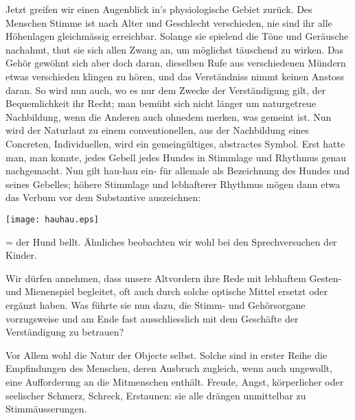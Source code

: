 Jetzt greifen wir einen Augenblick in’s physiologische Gebiet zurück. Des Menschen Stimme ist nach Alter und Geschlecht verschieden, nie sind ihr alle Höhenlagen gleichmässig erreichbar. Solange sie spielend \label{fp.302} die Töne und Geräusche nachahmt, thut sie sich allen Zwang an, um möglichst täuschend zu wirken. Das Gehör gewöhnt sich aber doch daran, dieselben Rufe aus verschiedenen Mündern etwas verschieden klingen zu hören, und das Verständniss nimmt keinen Anstoss daran. So wird nun auch, wo es nur dem Zwecke der Verständigung gilt, der Bequemlichkeit ihr Recht; man bemüht sich nicht länger um naturgetreue Nachbildung, wenn die Anderen  auch ohnedem merken, was gemeint ist. Nun wird der Naturlaut zu einem conventionellen, aus der Nachbildung eines Concreten, Individuellen, wird ein gemeingültiges, abstractes Symbol. Erst hatte man,  man konnte, jedes Gebell jedes Hundes in Stimmlage und Rhythmus genau nachgemacht. Nun gilt hau-hau ein- für allemale als Bezeichnung des Hundes und seines Gebelles; höhere Stimmlage und lebhafterer Rhythmus mögen dann etwa das Verbum vor dem Substantive auszeichnen:

\begin{center}
\texttt{[image: hauhau.eps]}
\end{center}

\noindent = der Hund bellt. Ähnliches beobachten wir wohl bei den Sprechversuchen der Kinder. 

Wir dürfen annehmen, dass unsere Altvordern ihre Rede mit lebhaftem Gesten- und Mienenspiel begleitet, oft auch durch solche optische Mittel ersetzt \label{sp.312} oder ergänzt haben. Was führte sie nun dazu, die Stimm- und Gehörsorgane vorzugsweise und am Ende fast ausschliesslich mit dem Geschäfte der Verständigung zu betrauen?

Vor Allem wohl die Natur der Objecte selbst. Solche sind in erster Reihe die Empfindungen des Menschen, deren Ausbruch zugleich, wenn auch ungewollt, eine Aufforderung an die Mitmenschen enthält. Freude, Angst, körperlicher oder seelischer Schmerz, Schreck, Erstaunen: sie alle drängen unmittelbar zu Stimmäusserungen.

